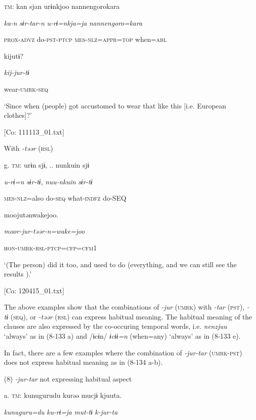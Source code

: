     \textsc{tm}:  kan  sjan  urɨnkjoo  {\textbar}nannengoro{\textbar}kara

      \textit{ka-n}  \textit{sɨr-tar-n}  \textit{u-rɨ=nkja=ja}  \textit{nannengoro=kara}

      \textsc{prox}-\textsc{advz}  do-\textsc{pst}-\textsc{ptcp}  \textsc{mes}-\textsc{nlz}=\textsc{appr}=\textsc{top}  when=\textsc{abl}

      kijutɨ?

      \textit{kij-jur-tɨ}

      wear-\textsc{umrk}-\textsc{seq}

      ‘Since when (people) got accustomed to wear that like this [i.e. European clothes]?’

      [Co: 111113\_01.txt]

  With \textit{{}-təər} (\textsc{rsl})

  g.  \textsc{tm}:  urɨn  sjɨ, ..  nunkuin  sjɨ

      \textit{u-rɨ=n}  \textit{sɨr-tɨ,}  \textit{nuu-nkuin}  \textit{sɨr-tɨ}

      \textsc{mes}-\textsc{nlz}=also  do-\textsc{seq}  what-\textsc{indfz}  do-SEQ

      moojutənwakejoo.

      \textit{moor-jur-təər{}-n=wake=joo}

      \textsc{hon}-\textsc{umrk}-\textsc{rsl}-\textsc{ptcp}=\textsc{cfp}=\textsc{cfm}1

      ‘(The person) did it too, and used to do (everything, and we can still see the results ).’

      [Co: 120415\_01.txt]

The above examples show that the combinations of \textit{{}-jur} (\textsc{umrk}) with \textit{{}-tar} (\textsc{pst}), \textit{{}-tɨ} (\textsc{seq}), or \textit{{}-təər} (\textsc{rsl}) can express habitual meaning. The habitual meaning of the clauses are also expressed by the co-occuring temporal words, i.e. \textit{nenzjuu} ‘always’ as in (8-133 a) and /ɨcɨn/ \textit{ɨcɨɨ=n} (when=any) ‘always’ as in (8-133 e).

  In fact, there are a few examples where the combination of \textit{{}-jur-tar} (\textsc{umrk}-\textsc{pst}) does not express habitual meaning as in (8-134 a-b).

(8)  \textit{{}-jur-tar} not expressing habitual aspect

  a.  \textsc{tm}:  kunugurudu  kurəə  mucjɨ  kjuuta.

      \textit{kunuguru=du}  \textit{ku-rɨ=ja}  \textit{mut-tɨ}  \textit{k-jur-ta}

